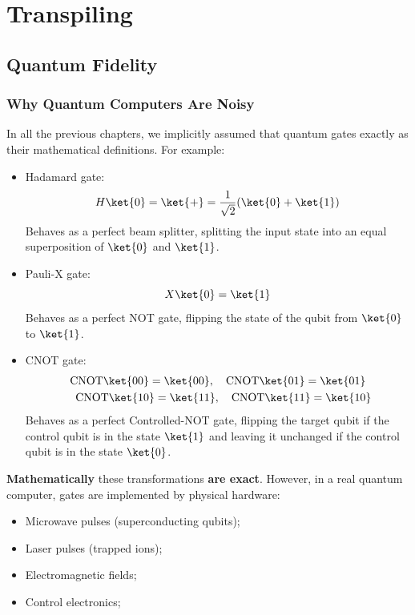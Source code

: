 \section{Transpiling}\label{sec:transpiling}

\subsection{Quantum Fidelity}\label{sec:quantum-fidelity}

\subsubsection{Why Quantum Computers Are Noisy}\label{sec:why-quantum-computers-are-noisy}

In all the previous chapters, we implicitly assumed that quantum gates exactly as their mathematical definitions. For example:
\begin{itemize}
    \item Hadamard gate:
    \begin{equation*}
        H\ket{0} = \ket{+} = \frac{1}{\sqrt{2}}(\ket{0} + \ket{1})
    \end{equation*}
    Behaves as a perfect beam splitter, splitting the input state into an equal superposition of $\ket{0}$ and $\ket{1}$.

    \item Pauli-X gate:
    \begin{equation*}
        X\ket{0} = \ket{1}
    \end{equation*}
    Behaves as a perfect NOT gate, flipping the state of the qubit from $\ket{0}$ to $\ket{1}$.

    \item CNOT gate:
    \begin{gather*}
        \text{CNOT}\ket{00} = \ket{00}, \quad \text{CNOT}\ket{01} = \ket{01} \\
        \quad \text{CNOT}\ket{10} = \ket{11}, \quad \text{CNOT}\ket{11} = \ket{10}
    \end{gather*}
    Behaves as a perfect Controlled-NOT gate, flipping the target qubit if the control qubit is in the state $\ket{1}$ and leaving it unchanged if the control qubit is in the state $\ket{0}$.
\end{itemize}
\textbf{Mathematically} these transformations \textbf{are exact}. However, in a real quantum computer, gates are implemented by physical hardware:
\begin{itemize}
    \item Microwave pulses (superconducting qubits);
    \item Laser pulses (trapped ions);
    \item Electromagnetic fields;
    \item Control electronics;
\end{itemize}
